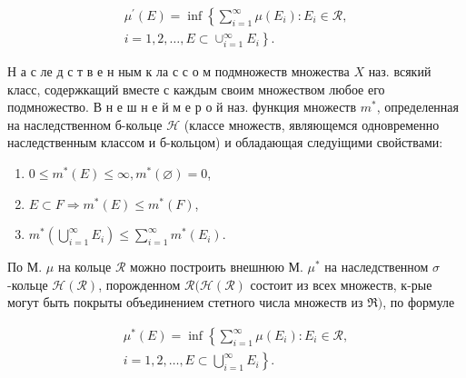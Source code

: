 \documentclass[10pt]{article}
\begin{document}
\[

\begin{gathered}

\mu^{\prime}(E)=\inf \left\{\sum_{i=1}^{\infty} \mu\left(E_{i}\right): E_{i} \in \mathcal{R},\right. \\

\left.i=1,2, \ldots, E \subset \cup_{i=1}^{\infty} E_{i}\right\} .

\end{gathered}

\]



Н а с ле д с т в е н ным к ла с с о м подмножеств множества $X$ наз. всякий класс, содержкащий вместе с каждым своим множеством любое его подмножество. В н е ш н е й м е р о й наз. функция множеств $m^{*}$, определенная на наследственном б-кольце $\mathscr{H}$ (классе множеств, являющемся одновременно наследственным классом и б-кольцом) и обладающая следуіщими свойствами:



\begin{enumerate}

  \item $0 \leqslant m^{*}(E) \leqslant \infty, m^{*}(\varnothing)=0$,



  \item $E \subset F \Rightarrow m^{*}(E) \leqslant m^{*}(F)$,



  \item $m^{*}\left(\bigcup_{i=1}^{\infty} E_{i}\right) \leqslant \sum_{i=1}^{\infty} m^{*}\left(E_{i}\right)$.



\end{enumerate}



По М. $\mu$ на кольце $\mathscr{R}$ можно построить внешнюю М. $\mu^{*}$ на наследственном $\sigma$-кольце $\mathscr{H}(\mathscr{R})$, порожденном $\mathscr{R}(\mathscr{H}(\mathscr{R})$ состоит из всех множеств, к-рые могут быть покрыты объединением стетного числа множеств из $\Re)$, по формуле



\[

\begin{gathered}

\mu^{*}(E)=\inf \left\{\sum_{i=1}^{\infty} \mu\left(E_{i}\right): E_{i} \in \mathscr{R},\right. \\

\left.i=1,2, \ldots, E \subset \bigcup_{i=1}^{\infty} E_{i}\right\} .

\end{gathered}

\]
\end{document}
